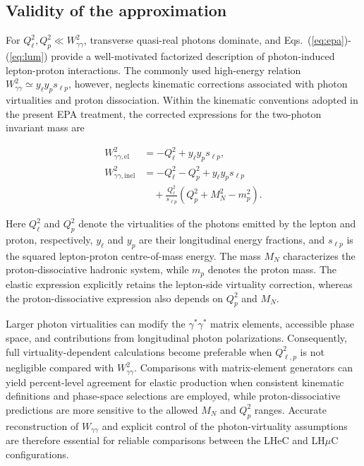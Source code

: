 \documentclass[11pt,a4paper]{article}
\begin{document}
\subsection{Validity of the approximation}\label{sec:Validity_EPA}

For $Q_\ell^2,Q_p^2\ll W_{\gamma\gamma}^2$, transverse quasi-real
photons dominate, and Eqs.~(\ref{eq:epa})-(\ref{eq:lum}) provide
a well-motivated factorized description of photon-induced
lepton-proton interactions. The commonly used high-energy relation
$W_{\gamma\gamma}^2\simeq y_\ell y_p s_{\ell p}$, however, neglects
kinematic corrections associated with photon virtualities and
proton dissociation. Within the kinematic conventions adopted in
the present EPA treatment, the corrected expressions for the
two-photon invariant mass are

\begin{equation}
\begin{aligned}
W_{\gamma\gamma,\mathrm{el}}^2
&= -Q_\ell^2+y_\ell y_p s_{\ell p},
\\[3pt]
W_{\gamma\gamma,\mathrm{inel}}^2
&= -Q_\ell^2-Q_p^2+y_\ell y_p s_{\ell p}
\\
&\quad
+\frac{Q_\ell^2}{s_{\ell p}}
\left(Q_p^2+M_N^2-m_p^2\right).
\end{aligned}
\label{eq:W_corrected}
\end{equation}


Here $Q_\ell^2$ and $Q_p^2$ denote the virtualities of the photons
emitted by the lepton and proton, respectively, $y_\ell$ and $y_p$
are their longitudinal energy fractions, and $s_{\ell p}$ is the
squared lepton-proton centre-of-mass energy. The mass $M_N$
characterizes the proton-dissociative hadronic system, while
$m_p$ denotes the proton mass. The elastic expression explicitly
retains the lepton-side virtuality correction, whereas the
proton-dissociative expression also depends on $Q_p^2$ and $M_N$.

Larger photon virtualities can modify the $\gamma^*\gamma^*$
matrix elements, accessible phase space, and contributions from
longitudinal photon polarizations. Consequently, full
virtuality-dependent calculations become preferable when
$Q_{\ell,p}^2$ is not negligible compared with
$W_{\gamma\gamma}^2$. Comparisons with matrix-element generators
can yield percent-level agreement for elastic production when
consistent kinematic definitions and phase-space selections are
employed, while proton-dissociative predictions are more sensitive
to the allowed $M_N$ and $Q_p^2$ ranges. Accurate reconstruction
of $W_{\gamma\gamma}$ and explicit control of the photon-virtuality
assumptions are therefore essential for reliable comparisons
between the LHeC and LH$\mu$C configurations.
\end{document}
